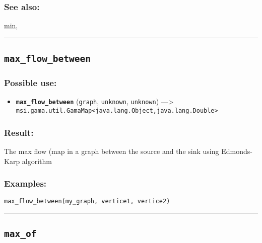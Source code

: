 \documentclass[]{book}
\providecommand{\tightlist}{%
  \setlength{\itemsep}{0pt}\setlength{\parskip}{0pt}}
\theoremstyle{definition}
\theoremstyle{definition}
\theoremstyle{definition}
\theoremstyle{remark}
\begin{document}
\subsubsection{See also:}\label{see-also-134}

\href{OperatorsIM\#min}{min},

\begin{center}\rule{0.5\linewidth}{\linethickness}\end{center}

\subsection{\texorpdfstring{\texttt{max\_flow\_between}}{max\_flow\_between}}\label{max_flow_between}

\subsubsection{Possible use:}\label{possible-use-340}

\begin{itemize}
\tightlist
\item
  \textbf{\texttt{max\_flow\_between}} (\texttt{graph},
  \texttt{unknown}, \texttt{unknown}) ---\textgreater{}
  \texttt{msi.gama.util.GamaMap\textless{}java.lang.Object,java.lang.Double\textgreater{}}
\end{itemize}

\subsubsection{Result:}\label{result-329}

The max flow (map in a graph between the source and the sink using
Edmonds-Karp algorithm

\subsubsection{Examples:}\label{examples-233}

\begin{verbatim}
max_flow_between(my_graph, vertice1, vertice2) 
\end{verbatim}

\begin{center}\rule{0.5\linewidth}{\linethickness}\end{center}

\subsection{\texorpdfstring{\texttt{max\_of}}{max\_of}}\label{max_of}
\end{document}
